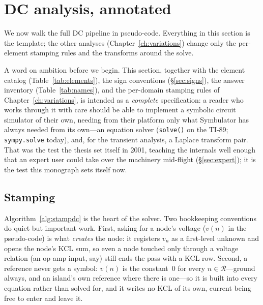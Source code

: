 \documentclass[11pt,oneside]{report}
\newcommand{\code}[1]{\texttt{#1}}
\begin{document}
\section{DC analysis, annotated}
\label{sec:dc}

We now walk the full DC pipeline in pseudo-code. Everything in this
section is the template; the other analyses (Chapter~\ref{ch:variations})
change only the per-element stamping rules and the transforms around
the solve.

A word on ambition before we begin. This section, together with the
element catalog (Table~\ref{tab:elements}), the sign conventions
(\S\ref{sec:signs}), the answer inventory (Table~\ref{tab:names}),
and the per-domain stamping rules of Chapter~\ref{ch:variations}, is
intended as a \emph{complete} specification: a reader who works
through it with care should be able to implement a symbolic circuit
simulator of their own, needing from their platform only what
Symbulator has always needed from its own---an equation solver
(\code{solve()} on the TI-89; \code{sympy.solve} today), and, for
the transient analysis, a Laplace transform pair. That was the test
the thesis set itself in 2001, teaching the internals well enough
that an expert user could take over the machinery mid-flight
(\S\ref{sec:expert}); it is the test this monograph sets itself now.

\subsection{Stamping}

Algorithm~\ref{alg:stampdc} is the heart of the solver. Two
bookkeeping conventions do quiet but important work. First, asking for
a node's voltage ($v(n)$ in the pseudo-code) is what \emph{creates}
the node: it registers $v_n$ as a first-level unknown and opens the
node's KCL sum, so even a node touched only through a voltage relation
(an op-amp input, say) still ends the pass with a KCL row. Second,
a reference never gets a symbol: $v(n)$ is the constant~$0$ for every
$n \in \mathcal{R}$---ground always, and an island's own reference
where there is one---so it is built into every equation rather than
solved for, and it writes no KCL of its own, current being free to
enter and leave it.
\end{document}
